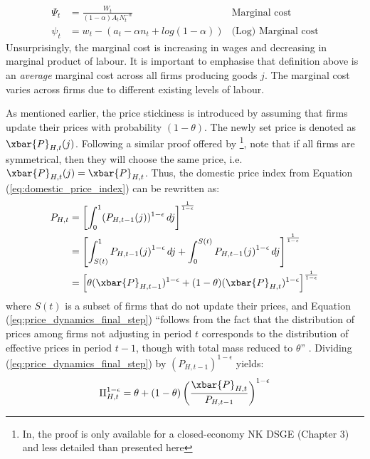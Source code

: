 \begin{align}
    \Psi_t &= \frac{W_t}{(1-\alpha)A_t N_t^{-\alpha}} & \text{Marginal cost}\\
    \psi_t &= w_t - (a_t - \alpha n_t + log(1-\alpha)) & \text{(Log) Marginal cost} \label{eq:log_average_marginal_cost}
\end{align}
Unsurprisingly, the marginal cost is increasing in wages and decreasing in marginal product of labour. It is important to emphasise that definition above is an \textit{average} marginal cost across all firms producing goods $j$. The marginal cost varies across firms due to different existing levels of labour. 

As mentioned earlier, the price stickiness is introduced by assuming that firms update their prices with probability $(1-\theta)$. The newly set price is denoted as $\xbar{P}_{H,t}(j)$. Following a similar proof offered by \textcite{jordigal_2015_monetary}\footnote{In, \textcite{jordigal_2015_monetary} the proof is only available for a closed-economy NK DSGE (Chapter 3) and less detailed than presented here}, note that if all firms are symmetrical, then they will choose the same price, i.e. $\xbar{P}_{H,t}(j) = \xbar{P}_{H,t}$. Thus, the domestic price index from Equation (\ref{eq:domestic_price_index}) can be rewritten as:
\begin{align}
    P_{H,t} &= \left[ \int_{0}^{1} (P_{H,t-1}(j))^{1-\epsilon} \, dj\right]^{\frac{1}{1-\epsilon}} \\
     &= \left[ \int_{S(t)}^{1} {P_{H,t-1}(j)}^{1-\epsilon} \, dj + \int_{0}^{S(t)}{P_{H,t-1}(j)}^{1-\epsilon} \, dj\right]^{\frac{1}{1-\epsilon}} \\
     &= \left[ \theta (\xbar{P}_{H,t-1})^{1-\epsilon} + (1-\theta)(\xbar{P}_{H,t})^{1-\epsilon} \right]^{\frac{1}{1-\epsilon}} \label{eq:price_dynamics_final_step}
\end{align}
where $S(t)$ is a subset of firms that do not update their prices, and Equation (\ref{eq:price_dynamics_final_step}) ``follows from the fact that the distribution of prices among firms not adjusting in period $t$ corresponds to the distribution of effective prices in period $t-1$, though with total mass reduced to $\theta$'' \parencite[84]{jordigal_2015_monetary}. Dividing (\ref{eq:price_dynamics_final_step}) by $(P_{H,t-1})^{1-\epsilon}$ yields:
\begin{equation}
    \Pi_{H,t}^{1-\epsilon} = \theta + (1-\theta)\left(\frac{\xbar{P}_{H,t}}{P_{H,t-1}}\right)^{1-\epsilon} \label{eq:price_dynamics_inflation}
\end{equation}
